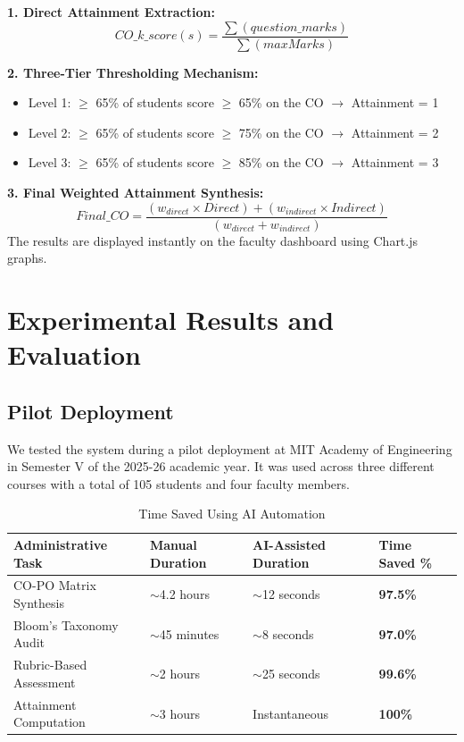 \documentclass[conference]{IEEEtran}
\begin{document}
\textbf{1. Direct Attainment Extraction:}
\begin{equation}
CO\_k\_score(s) = \frac{\sum (question\_marks)}{\sum (maxMarks)}
\end{equation}

\textbf{2. Three-Tier Thresholding Mechanism:}
\begin{itemize}
    \item Level 1: $\geq$ 65\% of students score $\geq$ 65\% on the CO $\rightarrow$ Attainment = 1
    \item Level 2: $\geq$ 65\% of students score $\geq$ 75\% on the CO $\rightarrow$ Attainment = 2
    \item Level 3: $\geq$ 65\% of students score $\geq$ 85\% on the CO $\rightarrow$ Attainment = 3
\end{itemize}

\textbf{3. Final Weighted Attainment Synthesis:}
\begin{equation}
Final\_CO = \frac{(w_{direct} \times Direct) + (w_{indirect} \times Indirect)}{(w_{direct} + w_{indirect})}
\end{equation}
The results are displayed instantly on the faculty dashboard using Chart.js graphs.

\section{Experimental Results and Evaluation}

\subsection{Pilot Deployment}
We tested the system during a pilot deployment at MIT Academy of Engineering in Semester V of the 2025-26 academic year. It was used across three different courses with a total of 105 students and four faculty members.

\begin{table}[htbp]
\caption{Time Saved Using AI Automation}
\begin{center}
\begin{tabular}{|p{2.5cm}|p{1.5cm}|p{1.5cm}|p{1.2cm}|}
\hline
\textbf{Administrative Task} & \textbf{Manual Duration} & \textbf{AI-Assisted Duration} & \textbf{Time Saved \%} \\
\hline
CO-PO Matrix Synthesis & $\sim$4.2 hours & $\sim$12 seconds & \textbf{97.5\%} \\
\hline
Bloom's Taxonomy Audit & $\sim$45 minutes & $\sim$8 seconds & \textbf{97.0\%} \\
\hline
Rubric-Based Assessment & $\sim$2 hours & $\sim$25 seconds & \textbf{99.6\%} \\
\hline
Attainment Computation & $\sim$3 hours & Instantaneous & \textbf{100\%} \\
\hline
\end{tabular}
\label{tab:time_saved}
\end{center}
\end{table}
\end{document}
